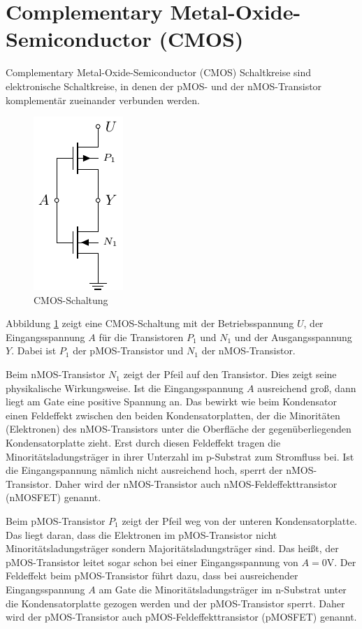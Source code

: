 \documentclass[oneside]{scrarticle}
\numberwithin{equation}{section}
\begin{document}
\section{Complementary Metal-Oxide-Semiconductor (CMOS)}
Complementary Metal-Oxide-Semiconductor (CMOS) Schaltkreise sind elektronische Schaltkreise, in denen der pMOS- und der nMOS-Transistor komplementär zueinander verbunden werden.
\begin{figure}[h]
	\centering
	\label{fig:cmos-not}
	\includegraphics[scale=2.0]{tkiz/cmos-not.pdf}
	\caption{CMOS-Schaltung}
\end{figure}
Abbildung \ref*{fig:cmos-not} zeigt eine CMOS-Schaltung mit der Betriebsspannung $U$, der Eingangsspannung $A$ für die Transistoren $P_1$ und $N_1$ und der Ausgangsspannung $Y$. Dabei ist $P_1$ der pMOS-Transistor und $N_1$ der nMOS-Transistor.

Beim nMOS-Transistor $N_1$ zeigt der Pfeil auf den Transistor. Dies zeigt seine physikalische Wirkungsweise. Ist die Eingangsspannung $A$ ausreichend groß, dann liegt am Gate eine positive Spannung an. Das bewirkt wie beim Kondensator einen Feldeffekt zwischen den beiden Kondensatorplatten, der die Minoritäten (Elektronen) des nMOS-Transistors unter die Oberfläche der gegenüberliegenden Kondensatorplatte zieht. Erst durch diesen Feldeffekt tragen die Minoritätsladungsträger in ihrer Unterzahl im p-Substrat zum Stromfluss bei. Ist die Eingangspannung nämlich nicht ausreichend hoch, sperrt der nMOS-Transistor. Daher wird der nMOS-Transistor auch nMOS-Feldeffekttransistor (nMOSFET) genannt.

Beim pMOS-Transistor $P_1$ zeigt der Pfeil weg von der unteren Kondensatorplatte. Das liegt daran, dass die Elektronen im pMOS-Transistor nicht Minoritätsladungsträger sondern Majoritätsladungsträger sind. Das heißt, der pMOS-Transistor leitet sogar schon bei einer Eingangsspannung von $A = 0\mathrm{V}$. Der Feldeffekt beim pMOS-Transistor führt dazu, dass bei ausreichender Eingangsspannung $A$ am Gate die Minoritätsladungsträger im n-Substrat unter die Kondensatorplatte gezogen werden und der pMOS-Transistor sperrt. Daher wird der pMOS-Transistor auch pMOS-Feldeffekttransistor (pMOSFET) genannt.
\end{document}
